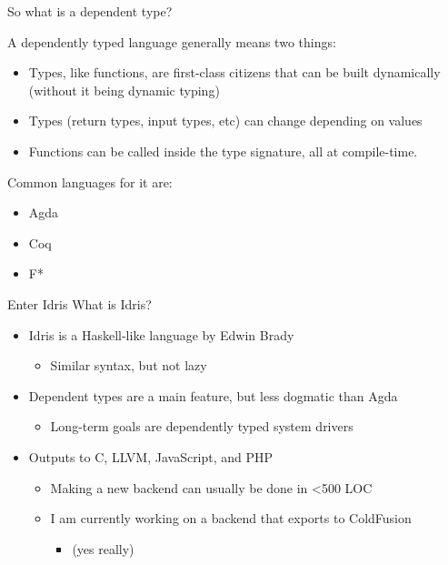 \documentclass{beamer}
\begin{document}
\begin{frame}{So what is a dependent type? }
	\transdissolve[duration=0.17]

	A dependently typed language generally means two things:
	\begin{itemize}	
		\pause
		\item Types, like functions, are first-class citizens that can be built dynamically (without it being dynamic typing)
		\pause
		\item Types (return types, input types, etc) can change depending on values
			\pause
			\item Functions can be called inside the type signature, all at compile-time.
			\pause
	\end{itemize}

	Common languages for it are: 
	\begin{itemize}	
		\item Agda
		\item Coq 
		\item F*
	\end{itemize}
\end{frame}
\begin{frame}{Enter Idris}
	\transdissolve[duration=0.17]
	What is Idris? 
	\begin{itemize}
		\pause
		\item Idris is a Haskell-like language by Edwin Brady \begin{itemize}
				\item Similar syntax, but not lazy
	\end{itemize}
	\pause
     \item Dependent types are a main feature, but less dogmatic than Agda \begin{itemize}
		\item Long-term goals are dependently typed system drivers
	\end{itemize}
		\pause
		\item Outputs to C, LLVM, JavaScript, and PHP \begin{itemize}
				\item Making a new backend can usually be done in \textless 500 LOC
				\pause
				\item I am currently working on a backend that exports to ColdFusion \begin{itemize}
					\pause
					\item[](yes really)
				\end{itemize}
			\end{itemize}
	\end{itemize}
\end{frame}
\end{document}
